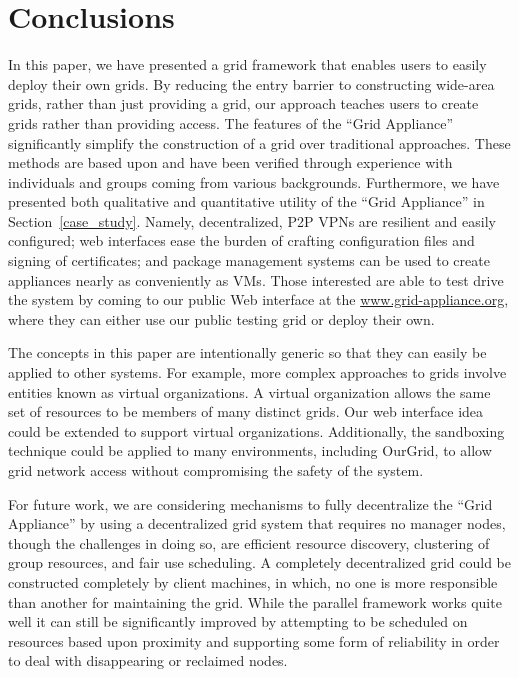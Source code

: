\documentclass[twocolumn]{svjour3}
\begin{document}
\section{Conclusions}
\label{conclusions}

In this paper, we have presented a grid framework that enables users to easily
deploy their own grids.  By reducing the entry barrier to constructing
wide-area grids, rather than just providing a grid, our approach teaches users
to create grids rather than providing access.  The features of the ``Grid
Appliance'' significantly simplify the construction of a grid over traditional
approaches.  These methods are based upon and have been verified through
experience with individuals and groups coming from various backgrounds.
Furthermore, we have presented both qualitative and quantitative utility of the
``Grid Appliance'' in Section~\ref{case_study}.  Namely, decentralized, P2P
VPNs are resilient and easily configured; web interfaces ease the burden of
crafting configuration files and signing of certificates; and package
management systems can be used to create appliances nearly as conveniently as
VMs.  Those interested are able to test drive the system by coming to our
public Web interface at the \url{www.grid-appliance.org}, where they can either
use our public testing grid or deploy their own.

The concepts in this paper are intentionally generic so that they can easily be
applied to other systems.  For example, more complex approaches to grids
involve entities known as virtual organizations.  A virtual organization allows
the same set of resources to be members of many distinct grids.  Our web
interface idea could be extended to support virtual organizations.
Additionally, the sandboxing technique could be applied to many environments,
including OurGrid, to allow grid network access without compromising the safety
of the system.

For future work, we are considering mechanisms to fully decentralize the ``Grid
Appliance'' by using a decentralized grid system that requires no manager
nodes, though the challenges in doing so, are efficient resource discovery,
clustering of group resources, and fair use scheduling.  A completely
decentralized grid could be constructed completely by client machines, in
which, no one is more responsible than another for maintaining the grid.  While
the parallel framework works quite well it can still be significantly improved
by attempting to be scheduled on resources based upon proximity and supporting
some form of reliability in order to deal with disappearing or reclaimed nodes.
\end{document}
